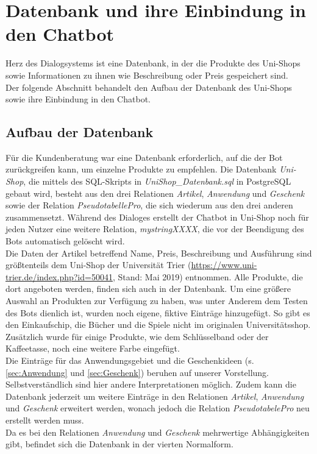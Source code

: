 \chapter{Datenbank und ihre Einbindung in den Chatbot}
\label{sec:DBuEinbindung}

Herz des Dialogsystems ist eine Datenbank, in der die Produkte des Uni-Shops sowie Informationen zu ihnen wie Beschreibung oder Preis gespeichert sind.\\
Der folgende Abschnitt behandelt den Aufbau der Datenbank des Uni-Shops sowie ihre Einbindung in den Chatbot.\\


\section{Aufbau der Datenbank}
\label{sec:DB}

Für die Kundenberatung war eine Datenbank erforderlich, auf die der Bot zurückgreifen kann, um einzelne Produkte zu empfehlen. Die Datenbank \textit{Uni-Shop}, die mittels des SQL-Skripts in \textit {UniShop\_Datenbank.sql} in PostgreSQL gebaut wird, besteht aus den drei Relationen \textit{Artikel}, \textit{Anwendung} und \textit{Geschenk} sowie der Relation \textit{PseudotabellePro}, die sich wiederum aus den drei anderen zusammensetzt. Während des Dialoges erstellt der Chatbot in Uni-Shop noch für jeden Nutzer eine weitere Relation, \textit{mystringXXXX}, die vor der Beendigung des Bots automatisch gelöscht wird.\\
Die Daten der Artikel betreffend Name, Preis, Beschreibung und Ausführung sind größtenteils dem Uni-Shop der Universität Trier (\url{https://www.uni-trier.de/index.php?id=50041}, Stand: Mai 2019) entnommen. Alle Produkte, die dort angeboten werden, finden sich auch in der Datenbank. Um eine größere Auswahl an Produkten zur Verfügung zu haben, was unter Anderem dem Testen des Bots dienlich ist, wurden noch eigene, fiktive Einträge hinzugefügt. So gibt es den Einkaufschip, die Bücher und die Spiele nicht im originalen Universitätsshop. Zusätzlich wurde für einige Produkte, wie dem Schlüsselband oder der Kaffeetasse, noch eine weitere Farbe eingefügt.\\
Die Einträge für das Anwendungsgebiet und die Geschenkideen (s. \ref{sec:Anwendung} und \ref{sec:Geschenk}) beruhen auf unserer Vorstellung. Selbstverständlich sind hier andere Interpretationen möglich. Zudem kann die Datenbank jederzeit um weitere Einträge in den Relationen \textit{Artikel}, \textit{Anwendung} und \textit{Geschenk} erweitert werden, wonach jedoch die Relation \textit{PseudotabelePro} neu erstellt werden muss.\\
Da es bei den Relationen \textit{Anwendung} und \textit{Geschenk} mehrwertige Abhängigkeiten gibt, befindet sich die Datenbank in der vierten Normalform.\\



